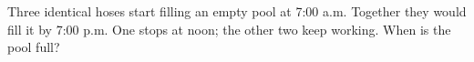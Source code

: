 Three identical hoses start filling an empty pool at 7:00 a.m. Together they would fill it by 7:00 p.m. One stops at noon; the other two keep working. When is the pool full?
